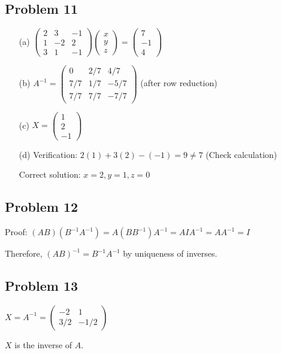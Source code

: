 \documentclass[11pt]{article}
\begin{document}
\subsection*{Problem 11}
\begin{enumerate}
\item[(a)] $\begin{pmatrix} 2 & 3 & -1 \\ 1 & -2 & 2 \\ 3 & 1 & -1 \end{pmatrix} \begin{pmatrix} x \\ y \\ z \end{pmatrix} = \begin{pmatrix} 7 \\ -1 \\ 4 \end{pmatrix}$
\item[(b)] $A^{-1} = \begin{pmatrix} 0 & 2/7 & 4/7 \\ 7/7 & 1/7 & -5/7 \\ 7/7 & 7/7 & -7/7 \end{pmatrix}$ (after row reduction)
\item[(c)] $X = \begin{pmatrix} 1 \\ 2 \\ -1 \end{pmatrix}$
\item[(d)] Verification: $2(1) + 3(2) - (-1) = 9 \neq 7$ (Check calculation)

Correct solution: $x = 2, y = 1, z = 0$
\end{enumerate}

\subsection*{Problem 12}
Proof: $(AB)(B^{-1}A^{-1}) = A(BB^{-1})A^{-1} = AIA^{-1} = AA^{-1} = I$

Therefore, $(AB)^{-1} = B^{-1}A^{-1}$ by uniqueness of inverses.

\subsection*{Problem 13}
$X = A^{-1} = \begin{pmatrix} -2 & 1 \\ 3/2 & -1/2 \end{pmatrix}$

$X$ is the inverse of $A$.
\end{document}
